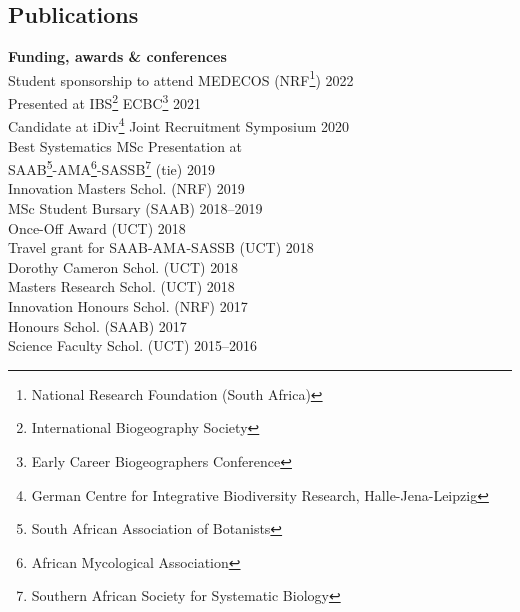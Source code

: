 \documentclass[10pt]{article}
\begin{document}


\bigskip



\subsection*{Publications} %



\hrulefill

\begin{multicols}{2}

\textbf{Funding, awards \& conferences}\\ %

Student sponsorship to attend MEDECOS {\small
  (NRF\footnote{National Research Foundation
  (South Africa)})}                                \hfill {\small       2022} \\
Presented at IBS\footnote{International
  Biogeography Society} ECBC\footnote{Early Career
  Biogeographers Conference}                       \hfill {\small       2021} \\
Candidate at iDiv\footnote{German Centre for
  Integrative Biodiversity Research,
  Halle-Jena-Leipzig} Joint Recruitment Symposium  \hfill {\small       2020} \\
Best Systematics MSc Presentation at                                          \\
\hspace{2em} SAAB\footnote{South African
  Association of Botanists}-AMA\footnote{African
  Mycological Association}-SASSB\footnote{Southern
  African Society for Systematic Biology} (tie)    \hfill {\small       2019} \\
Innovation Masters Schol.          {\small  (NRF)} \hfill {\small       2019} \\
MSc Student Bursary                {\small (SAAB)} \hfill {\small 2018--2019} \\
Once-Off Award                     {\small  (UCT)} \hfill {\small       2018} \\
Travel grant for SAAB-AMA-SASSB    {\small  (UCT)} \hfill {\small       2018} \\
Dorothy Cameron Schol.             {\small  (UCT)} \hfill {\small       2018} \\
Masters Research Schol.            {\small  (UCT)} \hfill {\small       2018} \\
Innovation Honours Schol.          {\small  (NRF)} \hfill {\small       2017} \\
Honours Schol.                     {\small (SAAB)} \hfill {\small       2017} \\
Science Faculty Schol.             {\small  (UCT)} \hfill {\small 2015--2016}


\end{multicols}
\end{document}
